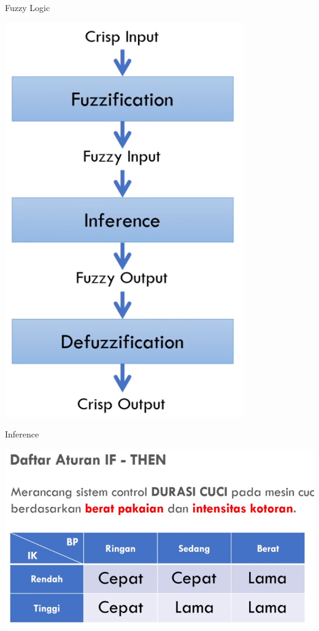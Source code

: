 \documentclass[pdflatex,compress,mathserif]{beamer}
\begin{document}
\begin{frame}{Fuzzy Logic}
	\begin{center}
		\includegraphics[height=0.8\textheight]{img/22}
	\end{center}
\end{frame}

\begin{frame}{Inference}
	\begin{center}
		\includegraphics[height=0.6\textheight]{img/28}
	\end{center}
\end{frame}
\end{document}
